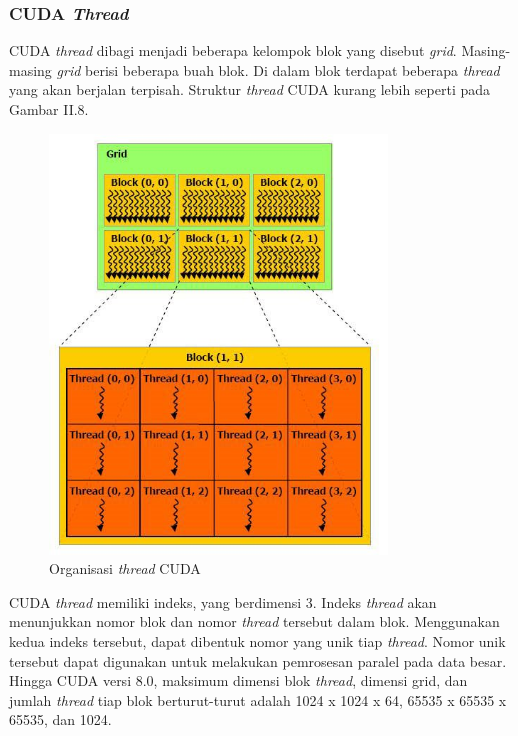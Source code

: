     \subsubsection{CUDA \emph{Thread}}
    
      CUDA \emph{thread} dibagi menjadi beberapa kelompok blok yang disebut \emph{grid}. Masing-masing \emph{grid} berisi beberapa buah blok. Di dalam blok terdapat beberapa \emph{thread} yang akan berjalan terpisah. Struktur \emph{thread} CUDA kurang lebih seperti pada Gambar II.8.
      
      \begin{figure}[htb]
        \centering
        \includegraphics[width=0.8\textwidth]{resources/cudathread.jpg}
        \caption[Organisasi \emph{thread} CUDA]{Organisasi \emph{thread} CUDA \citep{cuda}}
      \end{figure}
      
      CUDA \emph{thread} memiliki indeks, yang berdimensi 3. Indeks \emph{thread} akan menunjukkan nomor blok dan nomor \emph{thread} tersebut dalam blok. Menggunakan kedua indeks tersebut, dapat dibentuk nomor yang unik tiap \emph{thread}. Nomor unik tersebut dapat digunakan untuk melakukan pemrosesan paralel pada data besar. Hingga CUDA versi 8.0, maksimum dimensi blok \emph{thread}, dimensi grid, dan jumlah \emph{thread} tiap blok berturut-turut adalah 1024 x 1024 x 64, 65535 x 65535 x 65535, dan 1024.

